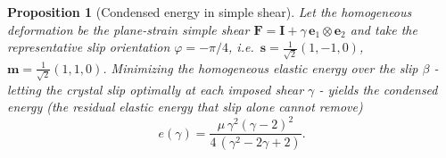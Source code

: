 \documentclass[10pt,a4paper]{amsart}
\newtheorem{proposition}{Proposition}
\newcommand{\bF}{\bm{F}}
\newcommand{\bI}{\bm{I}}
\newcommand{\bmm}{\bm{m}}
\newcommand{\bs}{\bm{s}}
\begin{document}
\begin{proposition}[Condensed energy in simple shear]\label{prop:condensed}
Let the homogeneous deformation be the plane-strain simple shear
$\bF=\bI+\gamma\,\bm{e}_1\otimes\bm{e}_2$ and take the representative slip
orientation $\varphi=-\pi/4$, i.e.\
$\bs=\tfrac1{\sqrt2}(1,-1,0)$, $\bmm=\tfrac1{\sqrt2}(1,1,0)$. Minimizing the
homogeneous elastic energy over the slip $\beta$ - letting the crystal slip
optimally at each imposed shear $\gamma$ - yields the \emph{condensed energy}
(the residual elastic energy that slip alone cannot remove)
\begin{equation}\label{eq:condensed}
  e(\gamma)=\frac{\mu\,\gamma^{2}(\gamma-2)^{2}}{4\,(\gamma^{2}-2\gamma+2)} .
\end{equation}
\end{proposition}
\end{document}
